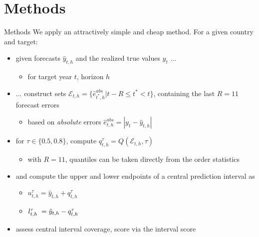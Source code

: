 \documentclass[en]{sdqbeamer}
\begin{document}
\section{Methods}
\begin{frame}{Methods}
We apply an attractively simple and cheap method. For a given country and target:
\begin{itemize}
    \item given forecasts $\hat{y}_{t, h}$ and the realized true values $y_{t}$ ...
    \begin{itemize}
        \item for target year $t$, horizon $h$
    \end{itemize}
    \item ... construct sets $\mathcal{E}_{t, h} = \{\hat{e}^{abs}_{t^*, h}  | t-R \leq t^* < t \}$, containing the last $R=11$ forecast errors
    \begin{itemize}
        \item based on \textit{absolute} errors $\hat{e}^{abs}_{t,h} = |y_{t} - \hat{y}_{t, h}| $
    \end{itemize}
    \item for $\tau \in \{0.5, 0.8\}$, compute $q^{\tau}_{t, h} =  Q\left(\mathcal{E}_{t, h}, \tau \right)$
    \begin{itemize}
        \item with $R=11$, quantiles can be taken directly from the order statistics
    \end{itemize}
    \item and compute the upper and lower endpoints of a central prediction interval as 
    \begin{itemize}
        \item $u^{\tau}_{t,h} = \hat{y}_{t, h} + q^{\tau}_{t, h}$ 
        \item $l^{\tau}_{t,h} \hspace{1mm} = \hat{y}_{t, h} - q^{\tau}_{t, h}$
    \end{itemize}
    \item assess central interval coverage, score via the interval score%
\end{itemize}
\end{frame}
\end{document}
